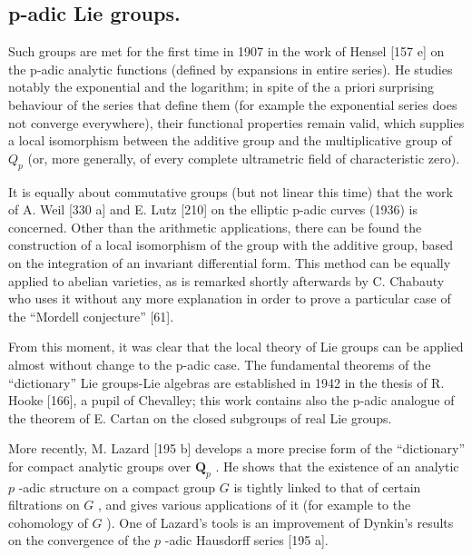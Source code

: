 \subsection{p-adic Lie groups.}

Such groups are met for the first time in 1907 in the work of Hensel {[}157 e{]} on the p-adic analytic functions (defined by expansions in entire series). He studies notably the exponential and the logarithm; in spite of the a priori surprising behaviour of the series that define them (for example the exponential series does not converge everywhere), their functional properties remain valid, which supplies a local isomorphism between the additive group and the multiplicative group of \(Q_{p}\) (or, more generally, of every complete ultrametric field of characteristic zero).

It is equally about commutative groups (but not linear this time) that the work of A. Weil {[}330 a{]} and E. Lutz {[}210{]} on the elliptic p-adic curves (1936) is concerned. Other than the arithmetic applications, there can be found the construction of a local isomorphism of the group with the additive group, based on the integration of an invariant differential form. This method can be equally applied to abelian varieties, as is remarked shortly afterwards by C. Chabauty who uses it without any more explanation in order to prove a particular case of the ``Mordell conjecture'' {[}61{]}.

From this moment, it was clear that the local theory of Lie groups can be applied almost without change to the p-adic case. The fundamental theorems of the ``dictionary'' Lie groups-Lie algebras are established in 1942 in the thesis of R. Hooke {[}166{]}, a pupil of Chevalley; this work contains also the p-adic analogue of the theorem of E. Cartan on the closed subgroups of real Lie groups.

More recently, M. Lazard {[}195 b{]} develops a more precise form of the ``dictionary'' for compact analytic groups over \(\mathbf{Q}_p\) . He shows that the existence of an analytic \(p\) -adic structure on a compact group \(G\) is tightly linked to that of certain filtrations on \(G\) , and gives various applications of it (for example to the cohomology of \(G\) ). One of Lazard's tools is an improvement of Dynkin's results on the convergence of the \(p\) -adic Hausdorff series {[}195 a{]}.

